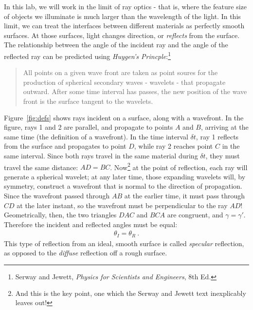 \documentclass[12pt]{article}
\begin{document}
In this lab, we will work in the limit of ray optics - that is, where
the feature size of objects we illuminate is much larger than the
wavelength of the light.  In this limit, we can treat the interfaces
between different materials as perfectly smooth surfaces.  At those
surfaces, light changes direction, or \textit{reflects} from the
surface.  The relationship between the angle of the incident ray and
the angle of the reflected ray can be predicted using \textit{Huygen's
  Princple}:\footnote{Serway and Jewett, \textit{Physics for
    Scientists and Engineers}, 8th Ed.}
\begin{quote}
  All points on a given wave front are taken as point soures for the
  production of spherical secondary waves - wavelets - that propagate
  outward.  After some time interval has passes, the new position of
  the wave front is the surface tangent to the wavelets.
\end{quote}
Figure~\ref{fig:defs} shows rays incident on a surface, along with a
wavefront.  In the figure, rays 1 and 2 are parallel, and propagate to
points $A$ and $B$, arriving at the same time (the definition of a
wavefront).  In the time interval $\delta t$, ray 1 reflects from the
surface and propagates to point $D$, while ray 2 reaches point $C$ in
the same interval.  Since both rays travel in the same material during
$\delta t$, they must travel the same distance: $AD = BC$.
Now\footnote{And this is the key point, one which the Serway and
  Jewett text inexplicably leaves out!} at the point of reflection,
each ray will generate a spherical wavelet; at any later time, those
expanding wavelets will, by symmetry, construct a wavefront that is
normal to the direction of propagation.  Since the wavefront passed
through $AB$ at the earlier time, it must pass through $CD$ at the
later instant, so the wavefront must be perpendicular to the ray $AD$!
Geometrically, then, the two triangles $DAC$ and $BCA$ are congruent,
and $\gamma = \gamma'$.  Therefore the incident and reflected angles
must be equal:
\begin{gather*}
  \theta_I = \theta_R\ .
\end{gather*}
This type of reflection from an ideal, smooth surface is called
\textit{specular} reflection, as opposed to the \textit{diffuse}
reflection off a rough surface.
\end{document}
